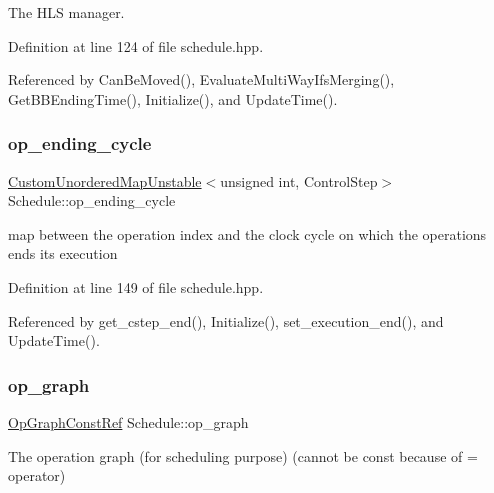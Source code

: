 The H\+LS manager. 



Definition at line 124 of file schedule.\+hpp.



Referenced by Can\+Be\+Moved(), Evaluate\+Multi\+Way\+Ifs\+Merging(), Get\+B\+B\+Ending\+Time(), Initialize(), and Update\+Time().

\mbox{\label{classSchedule_a3264650e2087ccdfeaf2b2e822dce958}} 
\subsubsection{\texorpdfstring{op\+\_\+ending\+\_\+cycle}{op\_ending\_cycle}}
{\footnotesize\ttfamily \hyperlink{custom__map_8hpp_a8cbaceffc09790a885ec7e9c17809c69}{Custom\+Unordered\+Map\+Unstable}$<$unsigned int, Control\+Step$>$ Schedule\+::op\+\_\+ending\+\_\+cycle\hspace{0.3cm}{\ttfamily [private]}}



map between the operation index and the clock cycle on which the operations ends its execution 



Definition at line 149 of file schedule.\+hpp.



Referenced by get\+\_\+cstep\+\_\+end(), Initialize(), set\+\_\+execution\+\_\+end(), and Update\+Time().

\mbox{\label{classSchedule_a3b416a5141bab0d0cca415dcc4e5c12d}} 
\subsubsection{\texorpdfstring{op\+\_\+graph}{op\_graph}}
{\footnotesize\ttfamily \hyperlink{op__graph_8hpp_a9a0b240622c47584bee6951a6f5de746}{Op\+Graph\+Const\+Ref} Schedule\+::op\+\_\+graph\hspace{0.3cm}{\ttfamily [private]}}



The operation graph (for scheduling purpose) (cannot be const because of = operator) 



